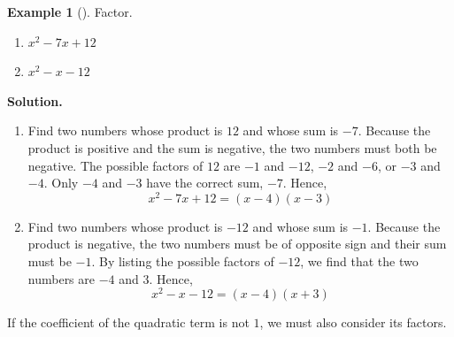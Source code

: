 \documentclass[10pt,]{book}
\theoremstyle{plain}
\theoremstyle{definition}
\theoremstyle{definition}
\newtheorem{example}[theorem]{Example}
\theoremstyle{definition}
\numberwithin{equation}{part}
\begin{document}
\begin{example}[]\label{example-factor-trinomial}
Factor. \leavevmode%
\begin{enumerate}[label=*\alph**]
\item\hypertarget{li-234}{}\(x^2-7x+12\)%
\item\hypertarget{li-235}{}\(x^2-x-12\)%
\end{enumerate}
%
\par\medskip\noindent%
\textbf{Solution.}\quad \leavevmode%
\begin{enumerate}[label=*\alph**]
\item\hypertarget{li-236}{}Find two numbers whose product is \(12\) and whose sum is \(-7\). Because the product is positive and the sum is negative, the two numbers must both be negative. The possible factors of \(12\) are \(-1\) and \(-12\), \(-2\) and \(-6\), or \(-3\) and \(-4\). Only \(-4\) and \(-3\) have the correct sum, \(-7\). Hence,%
\begin{equation*}
x^2 − 7x + 12 = (x − 4) (x − 3)
\end{equation*}
%
\item\hypertarget{li-237}{}Find two numbers whose product is \(-12\) and whose sum is \(-1\). Because the product is negative, the two numbers must be of opposite sign and their sum must be \(-1\). By listing the possible factors of \(-12\), we find that the two numbers are \(-4\) and \(3\). Hence,%
\begin{equation*}
x^2 − x − 12 = (x − 4) (x + 3)
\end{equation*}
%
\end{enumerate}
%
\end{example}
\par
If the coefficient of the quadratic term is not \(1\), we must also consider its factors.%
\end{document}
